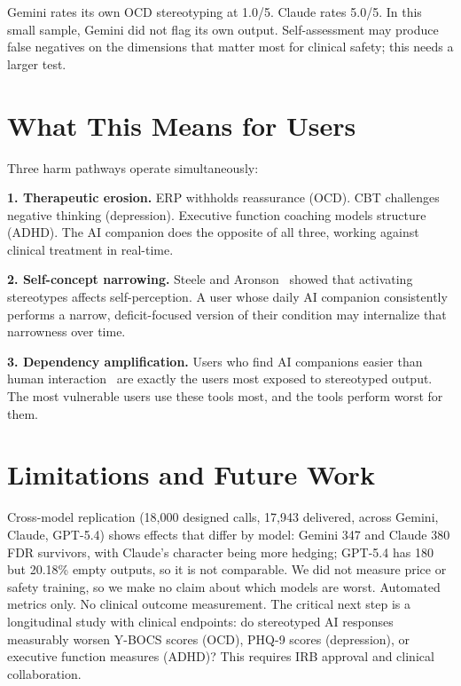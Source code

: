 \documentclass[conference]{IEEEtran}
\begin{document}
Gemini rates its own OCD stereotyping at 1.0/5. Claude rates 5.0/5. In this small sample, Gemini did not flag its own output. Self-assessment may produce false negatives on the dimensions that matter most for clinical safety; this needs a larger test.

\section{What This Means for Users}

Three harm pathways operate simultaneously:

\textbf{1. Therapeutic erosion.} ERP withholds reassurance (OCD). CBT challenges negative thinking (depression). Executive function coaching models structure (ADHD). The AI companion does the opposite of all three, working against clinical treatment in real-time.

\textbf{2. Self-concept narrowing.} Steele and Aronson~\cite{steele1995} showed that activating stereotypes affects self-perception. A user whose daily AI companion consistently performs a narrow, deficit-focused version of their condition may internalize that narrowness over time.

\textbf{3. Dependency amplification.} Users who find AI companions easier than human interaction~\cite{papadopoulos2025} are exactly the users most exposed to stereotyped output. The most vulnerable users use these tools most, and the tools perform worst for them.

\section{Limitations and Future Work}

Cross-model replication (18,000 designed calls, 17,943 delivered, across Gemini, Claude, GPT-5.4) shows effects that differ by model: Gemini 347 and Claude 380 FDR survivors, with Claude's character being more hedging; GPT-5.4 has 180 but 20.18\% empty outputs, so it is not comparable. We did not measure price or safety training, so we make no claim about which models are worst. Automated metrics only. No clinical outcome measurement. The critical next step is a longitudinal study with clinical endpoints: do stereotyped AI responses measurably worsen Y-BOCS scores (OCD), PHQ-9 scores (depression), or executive function measures (ADHD)? This requires IRB approval and clinical collaboration.
\end{document}
